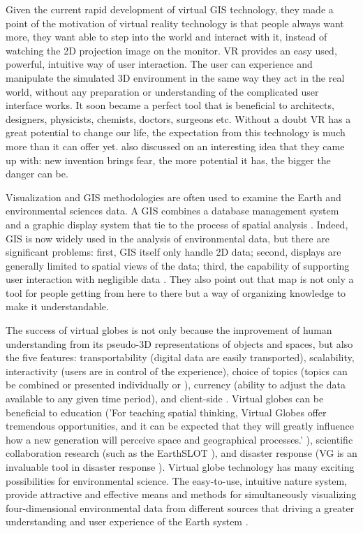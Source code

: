 Given the current rapid development of virtual GIS technology, they made a point of the motivation of virtual reality technology is that people always want more, they want able to step into the world and interact with it, instead of watching the 2D projection image on the monitor. VR provides an easy used, powerful, intuitive way of user interaction. The user can experience and manipulate the simulated 3D environment in the same way they act in the real world, without any preparation or understanding of the complicated user interface works. It soon became a perfect tool that is beneficial to architects, designers, physicists, chemists, doctors, surgeons etc. Without a doubt VR has a great potential to change our life, the expectation from this technology is much more than it can offer yet. \cite{mazuryk.vr.1996} also discussed on an interesting idea that they came up with: new invention brings fear, the more potential it has, the bigger the danger can be.

Visualization and GIS methodologies are often used to examine the Earth and environmental sciences data. A GIS combines a database management system and a graphic display system that tie to the process of spatial analysis \cite{rhyne.visualization-gis.1994, rhyne.virtual.1997}. Indeed, GIS is now widely used in the analysis of environmental data, but there are significant problems: first, GIS itself only handle 2D data; second, displays are generally limited to spatial views of the data; third, the capability of supporting user interaction with  negligible data \cite{rhyne.visualization-gis.1994}. They also point out that map is not only a tool for people getting from here to there but a way of organizing knowledge to make it understandable.

The success of virtual globes \cite{tuttle.virtual-globes.2008} is not only because the improvement of human understanding from its pseudo-3D representations of objects and spaces, but also the five features: transportability (digital data are easily transported), scalability, interactivity (users are in control of the experience), choice of topics (topics can be combined or presented individually or ), currency (ability to adjust the data available to any given time period), and client-side \cite{tuttle.virtual-globes.2008}. Virtual globes can be beneficial to education ('For teaching spatial thinking, Virtual Globes offer tremendous opportunities, and it can be expected that they will greatly influence how a new generation will perceive space and geographical processes.' \cite{nuernberger.vr-classroom.2006}), scientific collaboration research (such as the EarthSLOT \cite{earthslot.2016}), and disaster response (VG is an invaluable tool in disaster response \cite{butler.vg.2006, nourbakhsh.mapping-disaster-zones.2006}). Virtual globe technology has many exciting possibilities for environmental science. The easy-to-use, intuitive nature system, provide attractive and effective means and methods for simultaneously visualizing four-dimensional environmental data from different sources that driving a greater understanding and user experience of the Earth system \cite{blower.sharing-visualizing.2007}. 

